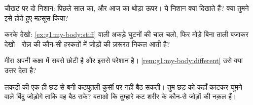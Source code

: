 \begin{exercise}[$\star$]\label{exo:g1:my-body:7}
चौखट पर दो निशान: पिछले साल का, और आज का थोड़ा ऊपर। ये निशान क्या
दिखाते हैं? क्या तुमने इसे होते हुए महसूस किया?
\end{exercise}

\begin{exercise}[$\star$]\label{exo:g1:my-body:8}
करके देखो: \cref{ex:g1:my-body:stiff} वाली अकड़े घुटनों की चाल चलो,
फिर  मोड़े बिना ताली बजाकर देखो। रोज़ की कौन-सी हरकतों में
जोड़ों की ज़रूरत निकल आती है?
\end{exercise}

\begin{exercise}[$\star\star$]\label{exo:g1:my-body:9}
मीरा अपनी कक्षा में सबसे छोटी है और इससे परेशान है।
\cref{rem:g1:my-body:different} उसे क्या उत्तर देता है?
\end{exercise}

\begin{exercise}[$\star\star$]\label{exo:g1:my-body:10}
लकड़ी की एक ही छड़ से बनी कठपुतली कुर्सी पर नहीं बैठ सकती। तुम छड़ को
कहाँ काटकर घूमने वाले बिंदु जोड़ोगे ताकि वह बैठ सके? बताओ कि तुम्हारे
कट शरीर के कौन-से जोड़ों की नक़ल हैं।
\end{exercise}
